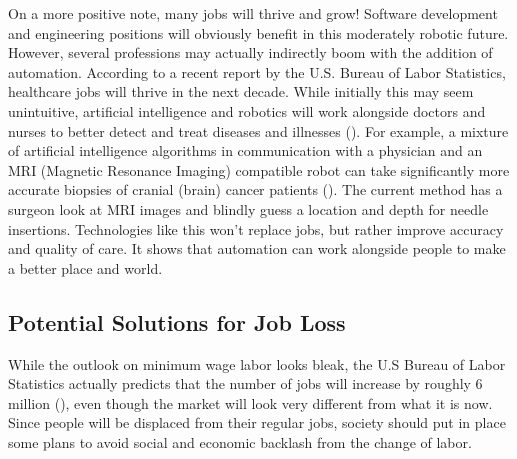 On a more positive note, many jobs will thrive and grow! Software development and engineering positions will obviously benefit in this moderately robotic future. However, several professions may actually indirectly boom with the addition of automation. According to a recent report by the U.S. Bureau of Labor Statistics, healthcare jobs will thrive in the next decade. While initially this may seem unintuitive, artificial intelligence and robotics will work alongside doctors and nurses to better detect and treat diseases and illnesses  (\cite{USBLS_JobsIn10Years}). For example, a mixture of artificial intelligence algorithms in communication with a physician and an MRI (Magnetic Resonance Imaging) compatible robot can take significantly more accurate biopsies of cranial (brain) cancer patients (\cite{Fischer_MRI_Robot}). The current method has a surgeon look at MRI images and blindly guess a location and depth for needle insertions. Technologies like this won't replace jobs, but rather improve accuracy and quality of care. It shows that automation can work alongside people to make a better place and world.

\subsection{Potential Solutions for Job Loss}

While the outlook on minimum wage labor looks bleak, the U.S Bureau of Labor Statistics actually predicts that the number of jobs will increase by roughly 6 million (\cite{USBLS_JobsIn10Years}), even though the market will look very different from what it is now. Since people will be displaced from their regular jobs, society should put in place some plans to avoid social and economic backlash from the change of labor.

